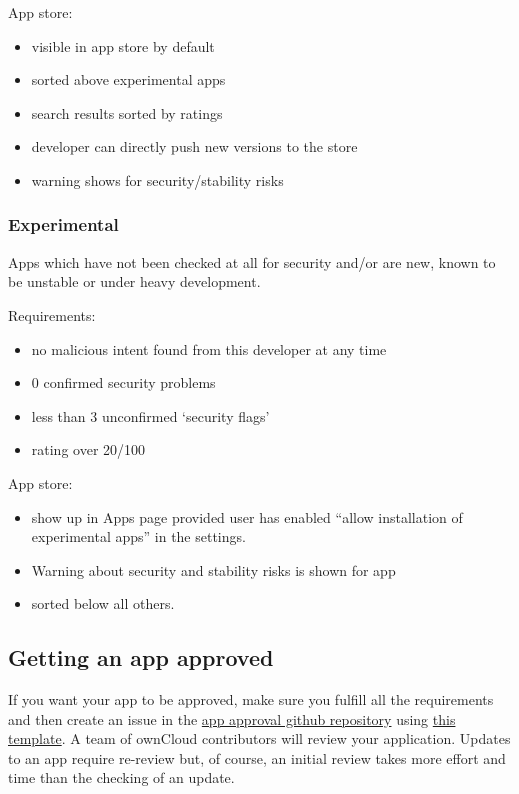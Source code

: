\documentclass[letterpaper,10pt,english]{sphinxmanual}
\begin{document}
App store:
\begin{itemize}
\item {} 
visible in app store by default

\item {} 
sorted above experimental apps

\item {} 
search results sorted by ratings

\item {} 
developer can directly push new versions to the store

\item {} 
warning shows for security/stability risks

\end{itemize}


\subsubsection{Experimental}
\label{app/publishing:experimental}
Apps which have not been checked at all for security and/or are new, known to be unstable or under heavy development.

Requirements:
\begin{itemize}
\item {} 
no malicious intent found from this developer at any time

\item {} 
0 confirmed security problems

\item {} 
less than 3 unconfirmed `security flags'

\item {} 
rating over 20/100

\end{itemize}

App store:
\begin{itemize}
\item {} 
show up in Apps page provided user has enabled ``allow installation of experimental apps'' in the settings.

\item {} 
Warning about security and stability risks is shown for app

\item {} 
sorted below all others.

\end{itemize}


\subsection{Getting an app approved}
\label{app/publishing:getting-an-app-approved}
If you want your app to be approved, make sure you fulfill all the requirements and then create an issue in the \href{https://github.com/owncloud/app-approval}{app approval github repository} using \href{https://github.com/owncloud/app-approval/blob/master/README.md}{this template}. A team of ownCloud contributors will review your application. Updates to an app require re-review but, of course, an initial review takes more effort and time than the checking of an update.
\end{document}
